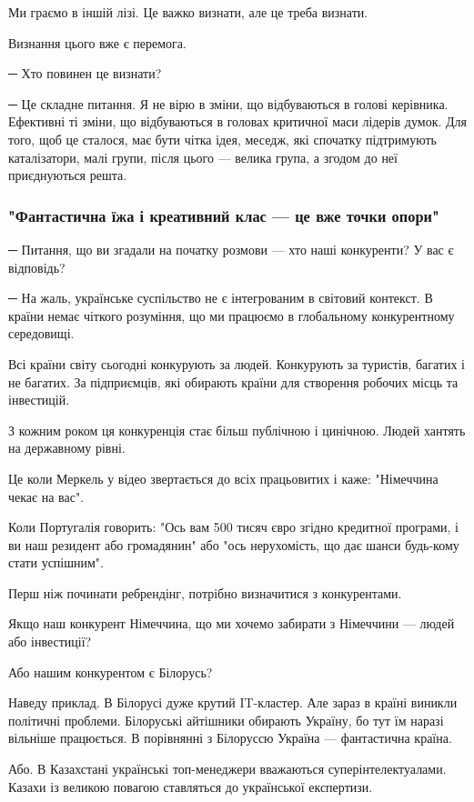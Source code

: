 Ми граємо в іншій лізі. Це важко визнати, але це треба визнати.

Визнання цього вже є перемога.

─ Хто повинен це визнати?

─ Це складне питання. Я не вірю в зміни, що відбуваються в голові керівника.
Ефективні ті зміни, що відбуваються в головах критичної маси лідерів думок. Для
того, щоб це сталося, має бути чітка ідея, меседж, які спочатку підтримують
каталізатори, малі групи, після цього --- велика група, а згодом до неї
приєднуються решта. 

\subsubsection{"Фантастична їжа і креативний клас --- це вже точки опори"}

─ Питання, що ви згадали на початку розмови --- хто наші конкуренти? У вас є
відповідь?

─ На жаль, українське суспільство не є інтегрованим в світовий контекст. В
країни немає чіткого розуміння, що ми працюємо в глобальному конкурентному
середовищі.

Всі країни світу сьогодні конкурують за людей. Конкурують за туристів, багатих
і не багатих. За підприємців, які обирають країни для створення робочих місць
та інвестицій.

З кожним роком ця конкуренція стає більш публічною і цинічною. Людей хантять на державному рівні.

Це коли Меркель у відео звертається до всіх працьовитих і каже: "Німеччина
чекає на вас". 

Коли Португалія говорить: "Ось вам 500 тисяч євро згідно кредитної програми, і
ви наш резидент або громадянин" або "ось нерухомість, що дає шанси будь-кому
стати успішним".

Перш ніж починати ребрендінг, потрібно визначитися з конкурентами.

Якщо наш конкурент Німеччина, що ми хочемо забирати з Німеччини --- людей або інвестиції?

Або нашим конкурентом є Білорусь?

Наведу приклад. В Білорусі дуже крутий IT-кластер. Але зараз в країні виникли
політичні проблеми. Білоруські айтішники обирають Україну, бо тут їм наразі
вільніше працюється. В порівнянні з Білоруссю Україна --- фантастична країна.

Або. В Казахстані українські топ-менеджери вважаються суперінтелектуалами.
Казахи із великою повагою ставляться до української експертизи.

